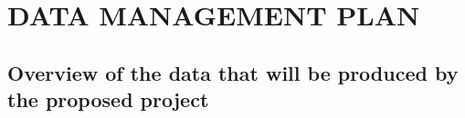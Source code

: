 \section{DATA MANAGEMENT PLAN}


\subsection{Overview of the data that will be produced by the proposed project}

